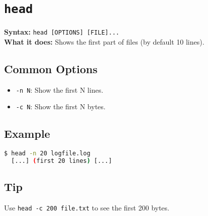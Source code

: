 \documentclass[10pt,oneside]{scrbook}
\begin{document}
\section{\texttt{head}}
\begin{cmdbox}
  \textbf{Syntax:} \lstinline!head [OPTIONS] [FILE]...! \\
  \textbf{What it does:} Shows the first part of files (by default 10 lines).
\end{cmdbox}
\begin{commanddetails}
  \subsection*{Common Options}
  \begin{itemize}
    \item \lstinline!-n N!: Show the first N lines.
    \item \lstinline!-c N!: Show the first N bytes.
  \end{itemize}

  \subsection*{Example}
  \begin{lstlisting}[language=bash]
$ head -n 20 logfile.log
  [...] (first 20 lines) [...]  
  \end{lstlisting}

  \subsection*{Tip}
  Use \lstinline!head -c 200 file.txt! to see the first 200 bytes.
\end{commanddetails}

\end{document}
